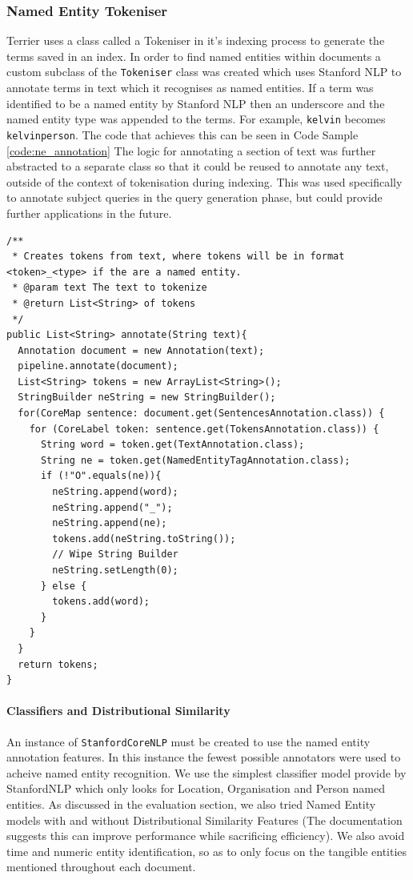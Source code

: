 \documentclass{l4proj}
\newcommand{\code}[1]{\texttt{#1}}
\newenvironment{codelisting}{\captionsetup{type=listing}}{}
\begin{document}
\subsubsection{Named Entity Tokeniser}
Terrier uses a class called a Tokeniser in it's indexing process to generate the terms saved in an index. In order to find named entities within documents a custom subclass of the \code{Tokeniser} class was created which uses Stanford NLP to annotate terms in text which it recognises as named entities.
If a term was identified to be a named entity by Stanford NLP then an underscore and the named entity type was appended to the terms. For example, 
\code{kelvin} becomes \code{kelvin\textunderscore person}. The code that achieves this can be seen in Code Sample \ref{code:ne_annotation}
The logic for annotating a section of text was further abstracted to a separate class so that it could be reused to annotate any text, outside of the context of tokenisation during indexing. This was used specifically to annotate subject queries in the query generation phase, but could provide further applications in the future.
\begin{codelisting}
\begin{verbatim}
/**
 * Creates tokens from text, where tokens will be in format <token>_<type> if the are a named entity.
 * @param text The text to tokenize
 * @return List<String> of tokens
 */
public List<String> annotate(String text){
  Annotation document = new Annotation(text);
  pipeline.annotate(document);
  List<String> tokens = new ArrayList<String>();
  StringBuilder neString = new StringBuilder();
  for(CoreMap sentence: document.get(SentencesAnnotation.class)) {
    for (CoreLabel token: sentence.get(TokensAnnotation.class)) {
	  String word = token.get(TextAnnotation.class);
	  String ne = token.get(NamedEntityTagAnnotation.class);
	  if (!"O".equals(ne)){
	    neString.append(word);
		neString.append("_");
		neString.append(ne);
		tokens.add(neString.toString());
		// Wipe String Builder
		neString.setLength(0);
	  } else {
	    tokens.add(word);
	  }
    }
  }
  return tokens;
}
\end{verbatim}
\label{code:ne_annotation}
\end{codelisting}

\paragraph{Classifiers and Distributional Similarity} \label{classifiers}
An instance of \code{StanfordCoreNLP} must be created to use the named entity annotation features.
In this instance the fewest possible annotators were used to acheive named entity recognition.
We use the simplest classifier model provide by StanfordNLP which only looks for Location, Organisation and Person named entities.
As discussed in the evaluation section, we also tried Named Entity models with and without Distributional Similarity Features (The documentation suggests this can improve performance while sacrificing efficiency).
We also avoid time and numeric entity identification, so as to only focus on the tangible entities mentioned throughout each document.
\end{document}
